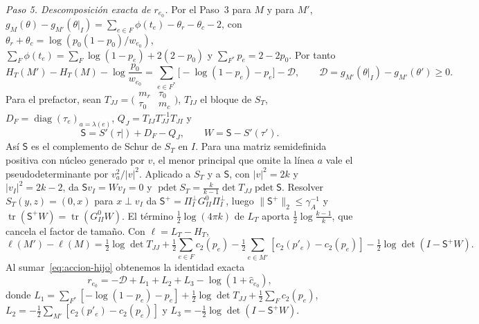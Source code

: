 
\emph{Paso 5. Descomposición exacta de $r_{e_0}$.} Por el Paso~3 para $M$ y para $M'$,
$g_M(\theta)-g_{M'}(\theta|_I)=\sum_{e\in F}\phi(t_e)-\theta_r-\theta_c-2$, con
$\theta_r+\theta_c=\log(p_0(1-p_0)/w_{e_0})$, $\sum_F\phi(t_e)=\sum_F\log(1-p_e)+2(2-p_0)$ y
$\sum_{F^*}p_e=2-2p_0$. Por tanto
\begin{equation}\label{eq:accion-hijo}
 H_T(M')-H_T(M)-\log\frac{p_0}{w_{e_0}}=\sum_{e\in F^*}\bigl[-\log(1-p_e)-p_e\bigr]-\mathcal D,\qquad
 \mathcal D=g_{M'}(\theta|_I)-g_{M'}(\theta')\ge0 .
\end{equation}
Para el prefactor, sean $T_{JJ}=\bigl(\begin{smallmatrix}m_r&\tau_0\\ \tau_0&m_c\end{smallmatrix}\bigr)$,
$T_{IJ}$ el bloque de $S_T$, $D_F=\operatorname{diag}(\tau_e)_{a=\lambda(e)}$,
$Q_J=T_{IJ}T_{JJ}^{-1}T_{JI}$ y
\[
 \mathsf S=S'(\tau|)+D_F-Q_J,\qquad W=\mathsf S-S'(\tau') .
\]
Así $\mathsf S$ es el complemento de Schur de $S_T$ en $I$. Para una matriz semidefinida positiva con
núcleo generado por $v$, el menor principal que omite la línea $a$ vale el pseudodeterminante por
$v_a^2/|v|^2$. Aplicado a $S_T$ y a $\mathsf S$, con $|v|^2=2k$ y $|v_I|^2=2k-2$, da
$\mathsf Sv_I=Wv_I=0$ y $\operatorname{pdet}S_T=\tfrac k{k-1}\det T_{JJ}\operatorname{pdet}\mathsf S$.
Resolver $S_T(y,z)=(0,x)$ para $x\perp v_I$ da $\mathsf S^+=\Pi_I^\perp G^0_{II}\Pi_I^\perp$, luego
$\|\mathsf S^+\|_2\le\gamma_A^{-1}$ y $\operatorname{tr}(\mathsf S^+W)=\operatorname{tr}(G^0_{II}W)$.
El término $\tfrac12\log(4\pi k)$ de $L_T$ aporta $\tfrac12\log\tfrac{k-1}k$, que cancela el factor de
tamaño. Con $\ell=L_T-H_T$,
\[
 \ell(M')-\ell(M)=\tfrac12\log\det T_{JJ}+\tfrac12\sum_{e\in F}c_2(p_e)
   -\tfrac12\sum_{e\in M'}[c_2(p'_e)-c_2(p_e)]-\tfrac12\log\det(I-\mathsf S^+W).
\]
Al sumar~\eqref{eq:accion-hijo} obtenemos la identidad exacta
\begin{equation}\label{eq:re-exacto}
 r_{e_0}=-\mathcal D+L_1+L_2+L_3-\log(1+\hat c_{e_0}),
\end{equation}
donde $L_1=\sum_{F^*}[-\log(1-p_e)-p_e]+\tfrac12\log\det T_{JJ}+\tfrac12\sum_Fc_2(p_e)$,
$L_2=-\tfrac12\sum_{M'}[c_2(p'_e)-c_2(p_e)]$ y $L_3=-\tfrac12\log\det(I-\mathsf S^+W)$.


